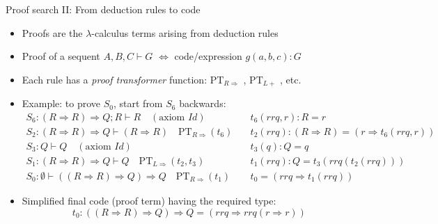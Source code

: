 \documentclass[english]{beamer}
\begin{document}
\begin{frame}{Proof search II: From deduction rules to code}

\begin{itemize}
\item Proofs are the $\lambda$-calculus terms arising from deduction rules
\item Proof of a sequent $A,B,C\vdash G$ $\Leftrightarrow$ code/expression
$g(a,b,c):G$
\item Each rule has a \emph{proof transformer} function: $\text{PT}_{R\Rightarrow}$
, $\text{PT}_{L+}$ , etc.
\item Example: to prove $S_{0}$, start from $S_{6}$ backwards:{\footnotesize{}
\begin{align*}
S_{6}:\left(R\Rightarrow R\right)\Rightarrow Q;R\vdash R\quad(\text{axiom }Id)\quad & t_{6}(rrq,r):R=r\\
S_{2}:\left(R\Rightarrow R\right)\Rightarrow Q\vdash\left(R\Rightarrow R\right)\quad\text{PT}_{R\Rightarrow}(t_{6})\quad & t_{2}(rrq):\left(R\Rightarrow R\right)=\left(r\Rightarrow t_{6}(rrq,r)\right)\\
S_{3}:Q\vdash Q\quad(\text{axiom }Id)\quad & t_{3}(q):Q=q\\
S_{1}:\left(R\Rightarrow R\right)\Rightarrow Q\vdash Q\quad\text{PT}_{L\Rightarrow}(t_{2},t_{3})\quad & t_{1}(rrq):Q=t_{3}(rrq(t_{2}(rrq)))\\
S_{0}:\emptyset\vdash\left(\left(R\Rightarrow R\right)\Rightarrow Q\right)\Rightarrow Q\quad\text{PT}_{R\Rightarrow}(t_{1})\quad & t_{0}=\left(rrq\Rightarrow t_{1}(rrq)\right)
\end{align*}
}{\footnotesize \par}
\item Simplified final code (proof term) having the required type: 
\[
t_{0}:\left(\left(R\Rightarrow R\right)\Rightarrow Q\right)\Rightarrow Q=\left(rrq\Rightarrow rrq\left(r\Rightarrow r\right)\right)
\]
\end{itemize}
\end{frame}
\end{document}
